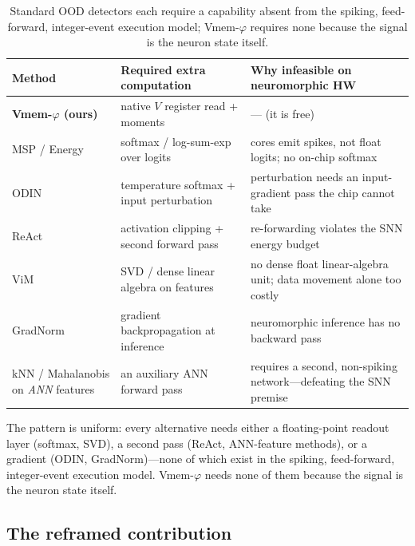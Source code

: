\begin{table}[t]
  \centering
  \small
  \begin{tabularx}{\linewidth}{@{}l X X@{}}
    \toprule
    Method & Required extra computation & Why infeasible on neuromorphic HW \\
    \midrule
    \textbf{Vmem-$\varphi$ (ours)} & native $V$ register read + moments & --- (it is free) \\
    MSP \cite{hendrycks2017msp} / Energy \cite{liu2020energy}
      & softmax / log-sum-exp over logits
      & cores emit spikes, not float logits; no on-chip softmax \\
    ODIN \cite{liang2018odin}
      & temperature softmax + input perturbation
      & perturbation needs an input-gradient pass the chip cannot take \\
    ReAct \cite{sun2021react}
      & activation clipping + second forward pass
      & re-forwarding violates the SNN energy budget \\
    ViM \cite{wang2022vim}
      & SVD / dense linear algebra on features
      & no dense float linear-algebra unit; data movement alone too costly \\
    GradNorm \cite{huang2021gradnorm}
      & gradient backpropagation at inference
      & neuromorphic inference has no backward pass \\
    kNN / Mahalanobis on \emph{ANN} features \cite{lee2018mahalanobis,sun2022knn}
      & an auxiliary ANN forward pass
      & requires a second, non-spiking network---defeating the SNN premise \\
    \bottomrule
  \end{tabularx}
  \caption{Standard OOD detectors each require a capability absent from the spiking,
  feed-forward, integer-event execution model; Vmem-$\varphi$ requires none because the signal
  is the neuron state itself.}
  \label{tab:hardware}
\end{table}

The pattern is uniform: every alternative needs either a floating-point readout layer
(softmax, SVD), a second pass (ReAct, ANN-feature methods), or a gradient (ODIN,
GradNorm)---none of which exist in the spiking, feed-forward, integer-event execution model.
Vmem-$\varphi$ needs none of them because the signal is the neuron state itself.

\subsection{The reframed contribution}
\label{sec:hardware-claim}

